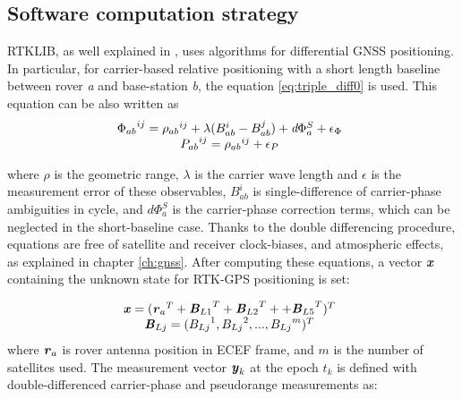 \subsection{Software computation strategy}
RTKLIB, as well explained in \cite{takasu:2009}, uses algorithms for differential GNSS positioning. In particular, for carrier-based relative
positioning with a short length baseline between rover \textit{a} and
base-station \textit{b}, the equation \ref{eq:triple_diff0} is used. This equation can be also written as
\begin{equation} 
	\begin{matrix} 
		{\Phi_{ab}}^{ij}={\rho_{ab}}^{ij}+\lambda(B_{ab}^{i}-B_{ab}^{j})+ \textit{d}\Phi_{a}^{S}+\epsilon_{\Phi}\\ 
		{P_{ab}}^{ij}={\rho_{ab}}^{ij}+  \epsilon_{P}
		\end{matrix}
	\\
	\label{eq:ddiff_rtklib}
\end{equation}

where $\rho$ is the geometric range, $\lambda$ is the carrier wave length and $\epsilon$ is the measurement error of 
these observables, $B_{ab}^{i}$ is single-difference of carrier-phase ambiguities in cycle, and $\textit{d}\Phi_{a}^{S}$ is the carrier‐phase correction terms, which can be neglected in the short‐baseline case.
Thanks to the double differencing procedure, equations are free of satellite and receiver clock-biases, and
atmospheric effects, as explained in chapter \ref{ch:gnss}.
After computing these equations, a vector \textbf{\textit{x}} containing the unknown state for RTK-GPS positioning is set:

\begin{equation} 
	\begin{matrix} 
		{\textbf{\textit{x}}}=({\textbf{\textit{r}}_{a}}^{T}+{\textbf{\textit{B}}_{L1}}^{T}+{\textbf{\textit{B}}_{L2}}^{T} + +{\textbf{\textit{B}}_{L5}}^{T})^{T}\\ 
		\textbf{\textit{B}}_{Lj}=({{B}_{Lj}}^{1}, {{B}_{Lj}}^{2},...,{{B}_{Lj}}^{m})^{T}
		\end{matrix}
	\\
	\label{eq:unkstate_rtklib}
\end{equation}
where $\textbf{\textit{r}}_{a}$ is rover antenna position in ECEF frame, and $m$ is the number of satellites used. The measurement vector ${\textbf{\textit{y}}}_{k}$ at the epoch $\textit{t}_{k}$ is
defined with double-differenced carrier-phase and pseudorange
measurements as:

